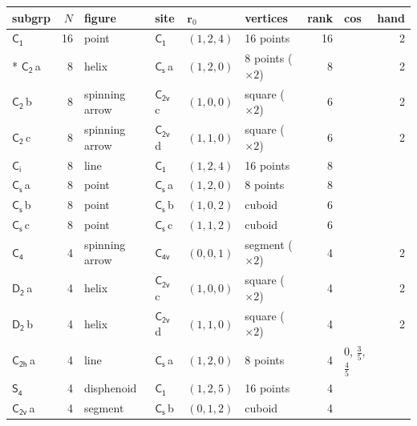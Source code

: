 \documentclass[10pt,a4paper]{article}
\numberwithin{equation}{section}
\newcommand{\grp}[1]{\mathsf{#1}}
\newcommand{\clsletter}[1]{\,{\scriptsize\color{black!55}#1}}
\newcommand{\pointr}{\mathbf{r}}
\newlength{\fillwidth}\newlength{\cellwidth}\newlength{\colwidth}
\begin{document}
{{\begin{longtable}{@{}lrllllr>{\RaggedRight\arraybackslash}p{\fillwidth}r@{}}
subgrp & $N$ & figure & site & $\pointr_0$ & vertices & rank & cos & hand\\\midrule\endhead
\bottomrule\endfoot\endlastfoot
\href{C1.pdf}{$\grp{C_{1}}$} & 16 & point & \href{C1.pdf}{$\grp{C_{1}}$} & $(1, 2, 4)$ & 16 points & 16 &  & 2\\*
\href{C2.pdf}{$\grp{C_{2}}$}\clsletter{a} & 8 & helix & \href{C1v.pdf}{$\grp{C_{s}}$}\clsletter{a} & $(1, 2, 0)$ & 8 points (${\times}2$) & 8 &  & 2\\
\href{C2.pdf}{$\grp{C_{2}}$}\clsletter{b} & 8 & spinning arrow & \href{C2v.pdf}{$\grp{C_{2v}}$}\clsletter{c} & $(1, 0, 0)$ & square (${\times}2$) & 6 &  & 2\\
\href{C2.pdf}{$\grp{C_{2}}$}\clsletter{c} & 8 & spinning arrow & \href{C2v.pdf}{$\grp{C_{2v}}$}\clsletter{d} & $(1, 1, 0)$ & square (${\times}2$) & 6 &  & 2\\
\href{S2.pdf}{$\grp{C_{i}}$} & 8 & line & \href{C1.pdf}{$\grp{C_{1}}$} & $(1, 2, 4)$ & 16 points & 8 &  & \\
\href{C1v.pdf}{$\grp{C_{s}}$}\clsletter{a} & 8 & point & \href{C1v.pdf}{$\grp{C_{s}}$}\clsletter{a} & $(1, 2, 0)$ & 8 points & 8 &  & \\
\href{C1v.pdf}{$\grp{C_{s}}$}\clsletter{b} & 8 & point & \href{C1v.pdf}{$\grp{C_{s}}$}\clsletter{b} & $(1, 0, 2)$ & cuboid & 6 &  & \\
\href{C1v.pdf}{$\grp{C_{s}}$}\clsletter{c} & 8 & point & \href{C1v.pdf}{$\grp{C_{s}}$}\clsletter{c} & $(1, 1, 2)$ & cuboid & 6 &  & \\
\href{C4.pdf}{$\grp{C_{4}}$} & 4 & spinning arrow & \href{C4v.pdf}{$\grp{C_{4v}}$} & $(0, 0, 1)$ & segment (${\times}2$) & 4 &  & 2\\
\href{D2.pdf}{$\grp{D_{2}}$}\clsletter{a} & 4 & helix & \href{C2v.pdf}{$\grp{C_{2v}}$}\clsletter{c} & $(1, 0, 0)$ & square (${\times}2$) & 4 &  & 2\\
\href{D2.pdf}{$\grp{D_{2}}$}\clsletter{b} & 4 & helix & \href{C2v.pdf}{$\grp{C_{2v}}$}\clsletter{d} & $(1, 1, 0)$ & square (${\times}2$) & 4 &  & 2\\
\href{C2h.pdf}{$\grp{C_{2h}}$}\clsletter{a} & 4 & line & \href{C1v.pdf}{$\grp{C_{s}}$}\clsletter{a} & $(1, 2, 0)$ & 8 points & 4 & ${0}$, ${\tfrac{3}{5}}$, ${\tfrac{4}{5}}$ & \\
\href{S4.pdf}{$\grp{S_{4}}$} & 4 & disphenoid & \href{C1.pdf}{$\grp{C_{1}}$} & $(1, 2, 5)$ & 16 points & 4 &  & \\
\href{C2v.pdf}{$\grp{C_{2v}}$}\clsletter{a} & 4 & segment & \href{C1v.pdf}{$\grp{C_{s}}$}\clsletter{b} & $(0, 1, 2)$ & cuboid & 4 &  & \\

\end{longtable}}}
\end{document}

